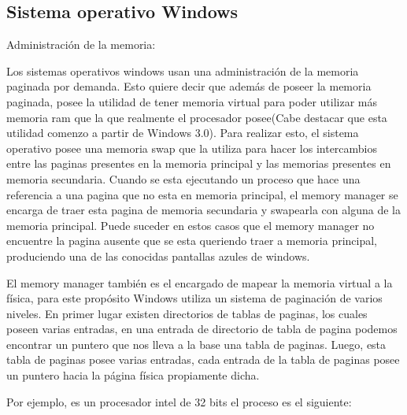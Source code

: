 \documentclass[a4paper, 12pt]{article}
\begin{document}
\subsection*{Sistema operativo Windows}

Administraci\'on de la memoria:

Los sistemas operativos windows usan una administraci\'on de la memoria paginada por demanda. Esto quiere decir que adem\'as de poseer la memoria paginada, posee la utilidad de tener memoria virtual para poder utilizar m\'as memoria ram que la que realmente el procesador posee(Cabe destacar que esta utilidad comenzo a partir de Windows 3.0). Para realizar esto, el sistema operativo posee una memoria swap que la utiliza para hacer los intercambios entre las paginas presentes en la memoria principal y las memorias presentes en memoria secundaria. Cuando se esta ejecutando un proceso que hace una referencia a una pagina que no esta en memoria principal, el memory manager se encarga de traer esta pagina de memoria secundaria y swapearla con alguna de la memoria principal. Puede suceder en estos casos que el memory manager no encuentre la pagina ausente que se esta queriendo traer a memoria principal, produciendo una de las conocidas pantallas azules de windows. 

El memory manager tambi\'en es el encargado de mapear la memoria virtual a la f\'isica, para este prop\'osito Windows utiliza un sistema de paginaci\'on de varios niveles. En primer lugar existen directorios de tablas de paginas, los cuales poseen varias entradas, en una entrada de directorio de tabla de pagina podemos encontrar un puntero que nos lleva a la base una tabla de paginas. Luego, esta tabla de paginas posee varias entradas, cada entrada de la tabla de paginas posee un puntero hacia la p\'agina f\'isica propiamente dicha. 


Por ejemplo, es un procesador intel de 32 bits el proceso es el siguiente:
\end{document}
